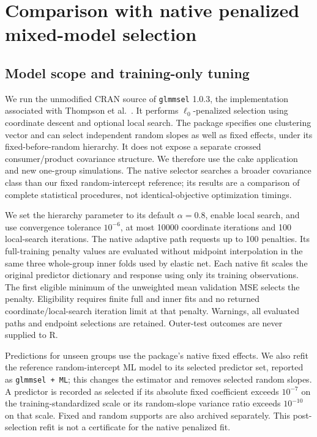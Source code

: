 \documentclass[preprint,11pt,numbers]{elsarticle}
\theoremstyle{remark}\newtheorem{remark}[theorem]{Remark}
\begin{document}
\section{Comparison with native penalized mixed-model selection}
\subsection{Model scope and training-only tuning}
We run the unmodified CRAN source of \texttt{glmmsel} 1.0.3, the implementation
associated with Thompson et al.~\cite{thompson,glmmselmanual}. It performs
$\ell_0$-penalized selection using coordinate descent and optional local search.
The package specifies one clustering vector and can select independent random
slopes as well as fixed effects, under its fixed-before-random hierarchy.
It does not expose a separate crossed consumer/product covariance structure.
We therefore use the cake application and new one-group simulations. The
native selector searches a broader covariance class than our fixed
random-intercept reference; its results are a comparison of complete
statistical procedures, not identical-objective optimization timings.

We set the hierarchy parameter to its default $\alpha=0.8$, enable local search,
and use convergence tolerance $10^{-6}$, at most 10000 coordinate iterations
and 100 local-search iterations. The native adaptive path requests up to 100
penalties. Its full-training penalty values are evaluated without midpoint
interpolation in the same three whole-group inner folds used by elastic net.
Each native fit scales the original predictor dictionary and response using
only its training observations. The first eligible minimum of the unweighted
mean validation MSE selects the penalty. Eligibility requires finite full and
inner fits and no returned coordinate/local-search iteration limit at that
penalty. Warnings, all evaluated paths and endpoint selections are retained.
Outer-test outcomes are never supplied to R.

Predictions for unseen groups use the package's native fixed effects. We also
refit the reference random-intercept ML model to its selected predictor set,
reported as \texttt{glmmsel + ML}; this changes the estimator and removes
selected random slopes. A predictor is recorded as selected if its absolute fixed
coefficient exceeds $10^{-7}$ on the training-standardized scale or its
random-slope variance ratio exceeds $10^{-10}$ on that scale. Fixed and random
supports are also archived separately. This post-selection refit is not a
certificate for the native penalized fit.
\end{document}
